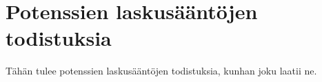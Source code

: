 \chapter{Potenssien laskusääntöjen todistuksia}
\label{pot_todistukset}
Tähän tulee potenssien laskusääntöjen todistuksia, kunhan joku laatii ne.
